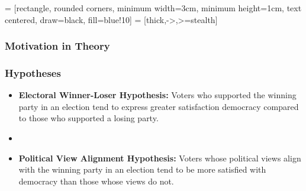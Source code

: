 \documentclass{beamer}
\begin{document}


\usetikzlibrary{shapes.geometric, arrows}

 = [rectangle, rounded corners, minimum width=3cm, minimum height=1cm, text centered, draw=black, fill=blue!10]
 = [thick,->,>=stealth]



\begin{frame}
\frametitle{Motivation in Theory}
\begin{center}
\end{center}
\end{frame}

\begin{frame}
    \frametitle{Hypotheses}
    \begin{itemize}
        \item \textbf{Electoral Winner-Loser Hypothesis:} Voters who supported the winning party in an election tend to express greater satisfaction democracy compared to those who supported a losing party.
        \item []
        \item \textbf{Political View Alignment Hypothesis:} Voters whose political views align with the winning party in an election tend to be more satisfied with democracy than those whose views do not.
    \end{itemize}
\end{frame}



\end{document}
